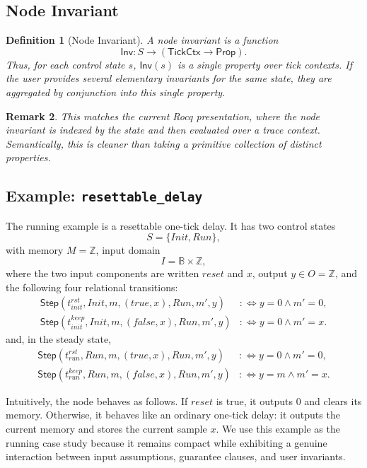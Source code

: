 \documentclass[11pt,a4paper]{article}
\newtheorem{definition}{Definition}[section]
\newtheorem{remark}[definition]{Remark}
\newcommand{\StepRel}{\mathsf{Step}}
\newcommand{\TickCtx}{\mathsf{TickCtx}}
\newcommand{\UserInv}{\mathsf{Inv}}
\begin{document}
\subsection{Node Invariant}

\begin{definition}[Node Invariant]
A node invariant is a function
\[
\UserInv : S \to (\TickCtx \to \mathsf{Prop}).
\]
Thus, for each control state \(s\), \(\UserInv(s)\) is a single property over
tick contexts. If the user provides several elementary invariants for the same
state, they are aggregated by conjunction into this single property.
\end{definition}

\begin{remark}
This matches the current Rocq presentation, where the node invariant is indexed
by the state and then evaluated over a trace context. Semantically, this is
cleaner than taking a primitive collection of distinct properties.
\end{remark}

\subsection{Example: \texttt{resettable\_delay}}

The running example is a resettable one-tick delay. It has two control states
\[
S = \{Init,Run\},
\]
with memory \(M = \mathbb{Z}\), input domain
\[
I = \mathbb{B} \times \mathbb{Z},
\]
where the two input components are written \(reset\) and \(x\), output
\(y \in O = \mathbb{Z}\), and the following four relational transitions:
\begin{align*}
\StepRel(t_{init}^{rst},Init,m,(true,x),Run,m',y)
&:\Longleftrightarrow
y = 0 \land m' = 0,\\
\StepRel(t_{init}^{keep},Init,m,(false,x),Run,m',y)
&:\Longleftrightarrow
y = 0 \land m' = x.
\end{align*}
and, in the steady state,
\begin{align*}
\StepRel(t_{run}^{rst},Run,m,(true,x),Run,m',y)
&:\Longleftrightarrow
y = 0 \land m' = 0,\\
\StepRel(t_{run}^{keep},Run,m,(false,x),Run,m',y)
&:\Longleftrightarrow
y = m \land m' = x.
\end{align*}

Intuitively, the node behaves as follows. If \(reset\) is true, it outputs
\(0\) and clears its memory. Otherwise, it behaves like an ordinary one-tick
delay: it outputs the current memory and stores the current sample \(x\). We
use this example as the running case study because it remains compact while
exhibiting a genuine interaction between input assumptions, guarantee clauses,
and user invariants.
\end{document}

